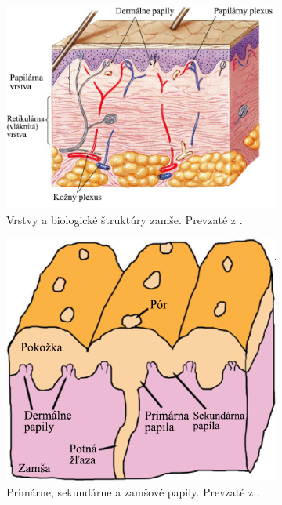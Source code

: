   \begin{figure}[h]\centering
    \centering
    \begin{subfigure}[b]{0.49\linewidth}
      \includegraphics[width=\linewidth]{obrazky-figures/zamsa.png}
      \caption{Vrstvy a biologické štruktúry zamše. Prevzaté z \cite{droual_dermis}.}
      \label{obr:zamsa_a_papily/zamsa}
    \end{subfigure}
    \hfill
    \begin{subfigure}[b]{0.49\linewidth}
      \includegraphics[width=\linewidth]{obrazky-figures/papily_prierez.png}
      \caption{Primárne, sekundárne a zamšové papily. Prevzaté z \cite{FingerprintSrcBook}.}
      \label{obr:zamsa_a_papily/papily_prierez}
    \end{subfigure}
    \caption{}
    \label{obr:zamsa_a_papily}
  \end{figure}
  
